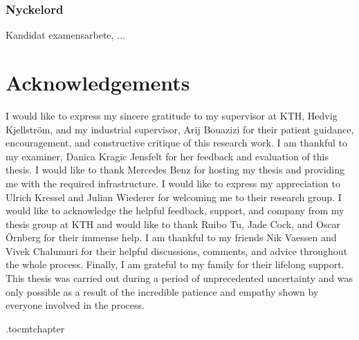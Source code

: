 \subsection*{Nyckelord}
Kandidat examensarbete, ...

\newpage
\thispagestyle{plain}
\chapter*{Acknowledgements}

I would like to express my sincere gratitude to my supervisor at KTH, Hedvig Kjellström, and my industrial supervisor, Arij Bouazizi for their patient guidance, encouragement, and constructive critique of this research work. I am thankful to my examiner, Danica Kragic Jensfelt for her feedback and evaluation of this thesis. I would like to thank Mercedes Benz for hosting my thesis and providing me with the required infrastructure. I would like to express my appreciation to Ulrich Kressel and Julian Wiederer for welcoming me to their research group. I would like to acknowledge the helpful feedback, support, and company from my thesis group at KTH and would like to thank Ruibo Tu, Jade Cock, and Oscar Örnberg for their immense help. I am thankful to my friends Nik Vaessen and Vivek Chalumuri for their helpful discussions, comments, and advice throughout the whole process. Finally, I am grateful to my family for their lifelong support. This thesis was carried out during a period of unprecedented uncertainty and was only possible as a result of the incredible patience and empathy shown by everyone involved in the process.   

\newpage



\newpage

\etocdepthtag.toc{mtchapter}
\thispagestyle{plain}
\tableofcontents

\newpage


